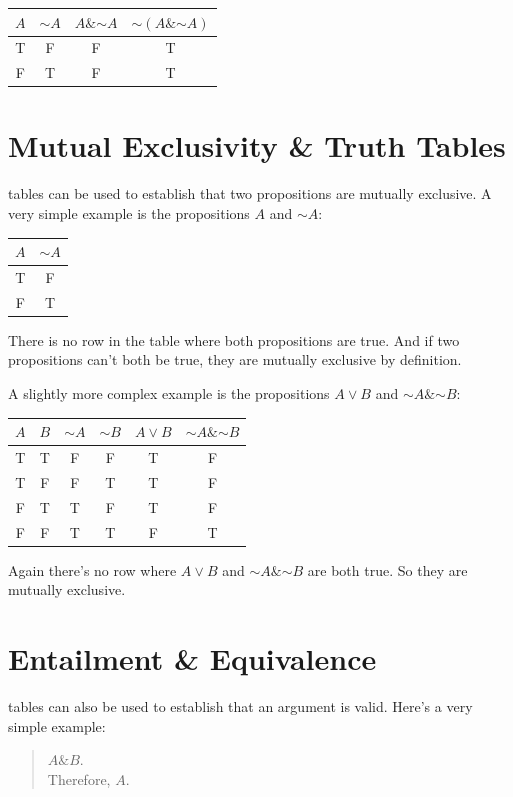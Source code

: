 \documentclass[justified]{tufte-book}
\renewcommand{\neg}{\mathbin{\sim}}
\renewcommand{\wedge}{\mathbin{\&}}
\begin{document}
\begin{longtable}[]{@{}cccc@{}}
\toprule
\(A\) & \(\neg A\) & \(A \wedge \neg A\) & \(\neg (A \wedge \neg A)\)\tabularnewline
\midrule
\endhead
T & F & F & T\tabularnewline
F & T & F & T\tabularnewline
\bottomrule
\end{longtable}

\hypertarget{mutual-exclusivity-truth-tables}{%
\section{Mutual Exclusivity \& Truth Tables}\label{mutual-exclusivity-truth-tables}}

 tables can be used to establish that two propositions are mutually exclusive. A very simple example is the propositions \(A\) and \(\neg A\):

\begin{longtable}[]{@{}cc@{}}
\toprule
\(A\) & \(\neg A\)\tabularnewline
\midrule
\endhead
T & F\tabularnewline
F & T\tabularnewline
\bottomrule
\end{longtable}

There is no row in the table where both propositions are true. And if two propositions can't both be true, they are mutually exclusive by definition.

A slightly more complex example is the propositions \(A \vee B\) and \(\neg A \wedge \neg B\):

\begin{longtable}[]{@{}cccccc@{}}
\toprule
\(A\) & \(B\) & \(\neg A\) & \(\neg B\) & \(A \vee B\) & \(\neg A \wedge \neg B\)\tabularnewline
\midrule
\endhead
T & T & F & F & T & F\tabularnewline
T & F & F & T & T & F\tabularnewline
F & T & T & F & T & F\tabularnewline
F & F & T & T & F & T\tabularnewline
\bottomrule
\end{longtable}

Again there's no row where \(A \vee B\) and \(\neg A \wedge \neg B\) are both true. So they are mutually exclusive.

\hypertarget{entailment-equivalence}{%
\section{Entailment \& Equivalence}\label{entailment-equivalence}}

 tables can also be used to establish that an argument is valid. Here's a very simple example:

\begin{quote}
\(A \wedge B\).\\
Therefore, \(A\).
\end{quote}
\end{document}
